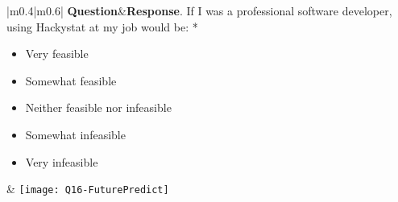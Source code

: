 \begin{center}
\footnotesize
\begin{longtable}{|m{}|m{}|}
\hline 
{\bf Question}&{\bf Response}\endhead {}. If I was a professional software developer, using Hackystat at my job would be: *
\begin{itemize}
\item Very feasible
\item Somewhat feasible
\item Neither feasible nor infeasible
\item Somewhat infeasible
\item Very infeasible
\end{itemize}
&
\texttt{[image: Q16-FuturePredict]} \\ \hline

\end{longtable}
\end{center}

